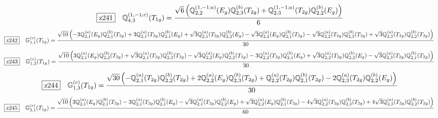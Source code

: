 \documentclass[fleqn,10pt,landscape]{jsarticle}
\begin{document}
\begin{dmath*}
\hspace*{3mm}\fbox{z241}\quad \mathbb{Q}_{4,3}^{(1,-1;c)}(T_{1g})=\frac{\sqrt{6} \left(\mathbb{Q}_{2,2}^{(1,-1;a)}(E_{g}) \mathbb{Q}_{2,3}^{(b)}(T_{2g}) + \mathbb{Q}_{2,3}^{(1,-1;a)}(T_{2g}) \mathbb{Q}_{2,2}^{(b)}(E_{g})\right)}{6}
\end{dmath*}
\begin{dmath*}
\hspace*{3mm}\fbox{z242}\quad \mathbb{G}_{1,1}^{(c)}(T_{1g})=\frac{\sqrt{10} \left(- 3 \mathbb{Q}_{2,1}^{(a)}(E_{g}) \mathbb{Q}_{2,1}^{(b)}(T_{2g}) + 3 \mathbb{Q}_{2,1}^{(a)}(T_{2g}) \mathbb{Q}_{2,1}^{(b)}(E_{g}) + \sqrt{3} \mathbb{Q}_{2,1}^{(a)}(T_{2g}) \mathbb{Q}_{2,2}^{(b)}(E_{g}) - \sqrt{3} \mathbb{Q}_{2,2}^{(a)}(E_{g}) \mathbb{Q}_{2,1}^{(b)}(T_{2g}) - \sqrt{3} \mathbb{Q}_{2,2}^{(a)}(T_{2g}) \mathbb{Q}_{2,3}^{(b)}(T_{2g}) + \sqrt{3} \mathbb{Q}_{2,3}^{(a)}(T_{2g}) \mathbb{Q}_{2,2}^{(b)}(T_{2g})\right)}{30}
\end{dmath*}
\begin{dmath*}
\hspace*{3mm}\fbox{z243}\quad \mathbb{G}_{1,2}^{(c)}(T_{1g})=\frac{\sqrt{10} \left(3 \mathbb{Q}_{2,1}^{(a)}(E_{g}) \mathbb{Q}_{2,2}^{(b)}(T_{2g}) + \sqrt{3} \mathbb{Q}_{2,1}^{(a)}(T_{2g}) \mathbb{Q}_{2,3}^{(b)}(T_{2g}) - \sqrt{3} \mathbb{Q}_{2,2}^{(a)}(E_{g}) \mathbb{Q}_{2,2}^{(b)}(T_{2g}) - 3 \mathbb{Q}_{2,2}^{(a)}(T_{2g}) \mathbb{Q}_{2,1}^{(b)}(E_{g}) + \sqrt{3} \mathbb{Q}_{2,2}^{(a)}(T_{2g}) \mathbb{Q}_{2,2}^{(b)}(E_{g}) - \sqrt{3} \mathbb{Q}_{2,3}^{(a)}(T_{2g}) \mathbb{Q}_{2,1}^{(b)}(T_{2g})\right)}{30}
\end{dmath*}
\begin{dmath*}
\hspace*{3mm}\fbox{z244}\quad \mathbb{G}_{1,3}^{(c)}(T_{1g})=\frac{\sqrt{30} \left(- \mathbb{Q}_{2,1}^{(a)}(T_{2g}) \mathbb{Q}_{2,2}^{(b)}(T_{2g}) + 2 \mathbb{Q}_{2,2}^{(a)}(E_{g}) \mathbb{Q}_{2,3}^{(b)}(T_{2g}) + \mathbb{Q}_{2,2}^{(a)}(T_{2g}) \mathbb{Q}_{2,1}^{(b)}(T_{2g}) - 2 \mathbb{Q}_{2,3}^{(a)}(T_{2g}) \mathbb{Q}_{2,2}^{(b)}(E_{g})\right)}{30}
\end{dmath*}
\begin{dmath*}
\hspace*{3mm}\fbox{z245}\quad \mathbb{G}_{3,1}^{(c)}(T_{1g})=\frac{\sqrt{10} \left(3 \mathbb{Q}_{2,1}^{(a)}(E_{g}) \mathbb{Q}_{2,1}^{(b)}(T_{2g}) - 3 \mathbb{Q}_{2,1}^{(a)}(T_{2g}) \mathbb{Q}_{2,1}^{(b)}(E_{g}) - \sqrt{3} \mathbb{Q}_{2,1}^{(a)}(T_{2g}) \mathbb{Q}_{2,2}^{(b)}(E_{g}) + \sqrt{3} \mathbb{Q}_{2,2}^{(a)}(E_{g}) \mathbb{Q}_{2,1}^{(b)}(T_{2g}) - 4 \sqrt{3} \mathbb{Q}_{2,2}^{(a)}(T_{2g}) \mathbb{Q}_{2,3}^{(b)}(T_{2g}) + 4 \sqrt{3} \mathbb{Q}_{2,3}^{(a)}(T_{2g}) \mathbb{Q}_{2,2}^{(b)}(T_{2g})\right)}{60}
\end{dmath*}
\end{document}
